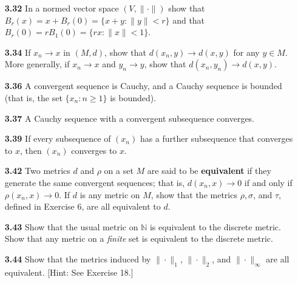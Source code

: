 \documentclass[12pt]{amsart}
\def\iff{if and only if }
\def\NN{{\mathbb N}}
\begin{document}
\begin{enumerate}
\bigskip

\item[\bf 3.32] In a normed vector space $(V, \|\cdot\|)$ show that $B_r(x)=x+B_r(0)=\{ x+y:\|y\|<r \}$ and that $B_r(0)=rB_1(0)=\{rx:\|x\|<1\}$.

\bigskip

\item[\bf 3.34] If $x_n\to x$ in $(M,d)$, show that $d(x_n,y)\to d(x,y)$ for any $y\in M$. More generally, if $x_n\to x$ and $y_n\to y$, show that $d(x_n,y_n)\to d(x,y)$.

\bigskip

\item[\bf 3.36] A convergent sequence is Cauchy, and a Cauchy sequence is bounded (that is, the set $\{x_n : n\geq 1\}$ is bounded).

\bigskip

\item[\bf 3.37] A Cauchy sequence with a convergent subsequence converges.

\bigskip

\item[\bf 3.39] If every subsequence of $(x_n)$ has a further subsequence that converges to $x$, then $(x_n)$ converges to $x$.

\bigskip

\item[\bf 3.42] Two metrics $d$ and $\rho$ on a set $M$ are said to be {\bf equivalent} if they generate the same convergent sequences; that is, $d(x_n, x)\to 0$ \iff $\rho(x_n,x)\to 0$. If $d$ is any metric on $M$, show that the metrics $\rho, \sigma$, and $\tau$, defined in Exercise 6, are all equivalent to $d$.

\bigskip

\item[\bf 3.43] Show that the usual metric on $\NN$ is equivalent to the discrete metric. Show that any metric on a \textit{finite} set is equivalent to the discrete metric. 

\bigskip

\item[\bf 3.44] Show that the metrics induced by $\|\cdot\|_1$, $\|\cdot\|_2$, and $\|\cdot\|_\infty$ are all equivalent. [Hint: See Exercise 18.]

\bigskip


\end{enumerate}
\end{document}
